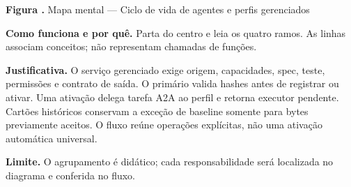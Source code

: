 {\small\textbf{Figura \thefigure.} Mapa mental --- Ciclo de vida de agentes e perfis gerenciados}\par\smallskip
\noindent\textbf{Como funciona e por quê.} Parta do centro e leia os quatro ramos. As linhas associam conceitos; não representam chamadas de funções.\par
\noindent\textbf{Justificativa.} O serviço gerenciado exige origem, capacidades, spec, teste, permissões e contrato de saída. O primário valida hashes antes de registrar ou ativar. Uma ativação delega tarefa A2A ao perfil e retorna executor pendente. Cartões históricos conservam a exceção de baseline somente para bytes previamente aceitos. O fluxo reúne operações explícitas, não uma ativação automática universal.\par
\noindent\textbf{Limite.} O agrupamento é didático; cada responsabilidade será localizada no diagrama e conferida no fluxo.\par\smallskip
{}
